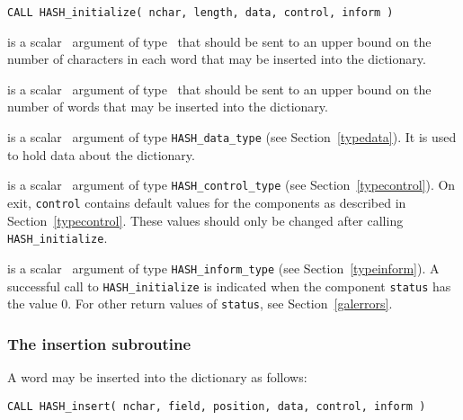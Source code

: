 \documentclass{galahad}
\newcommand{\packagename}{HASH}
\begin{document}
\hspace{8mm}
{\tt CALL \packagename\_initialize( nchar, length, data, control, inform )}

\vspace*{-2mm}
\begin{description}

 is a scalar \intentin\ argument of type \integer\ that
should be sent to an upper bound on the number of characters in each
word that may be inserted into the dictionary.

 is a scalar \intentin\ argument of type \integer\ that
should be sent to an upper bound on the number of words that
may be inserted into the dictionary.

 is a scalar \intentinout\ argument of type
{\tt \packagename\_data\_type}
(see Section~\ref{typedata}). It is used to hold data about the dictionary.

 is a scalar \intentout\ argument of type
{\tt \packagename\_control\_type}
(see Section~\ref{typecontrol}).
On exit, {\tt control} contains default values for the components as
described in Section~\ref{typecontrol}.
These values should only be changed after calling
{\tt \packagename\_initialize}.

 is a scalar \intentout\ argument of type
{\tt \packagename\_inform\_type}
(see Section~\ref{typeinform}). A successful call to
{\tt \packagename\_initialize}
is indicated when the  component {\tt status} has the value 0.
For other return values of {\tt status}, see Section~\ref{galerrors}.

\end{description}


\subsubsection{The insertion subroutine}\label{subinsert}
A word may be inserted into the dictionary as follows:
\vspace*{1mm}

\hspace{8mm}
{\tt CALL \packagename\_insert( nchar, field, position, data, control, inform )}
\end{document}
